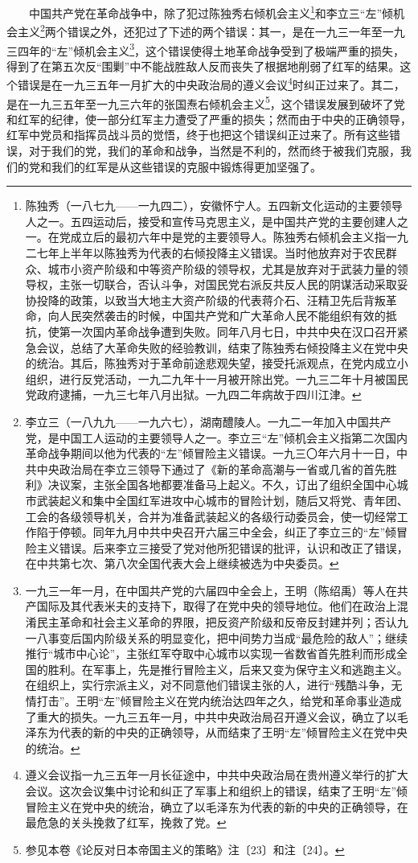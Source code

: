 \documentclass[cn,11pt,chinese]{elegantbook}
\begin{document}
　　中国共产党在革命战争中，除了犯过陈独秀右倾机会主义\footnote[4]{ 陈独秀（一八七九——一九四二），安徽怀宁人。五四新文化运动的主要领导人之一。五四运动后，接受和宣传马克思主义，是中国共产党的主要创建人之一。在党成立后的最初六年中是党的主要领导人。陈独秀右倾机会主义指一九二七年上半年以陈独秀为代表的右倾投降主义错误。当时他放弃对于农民群众、城市小资产阶级和中等资产阶级的领导权，尤其是放弃对于武装力量的领导权，主张一切联合，否认斗争，对国民党右派反共反人民的阴谋活动采取妥协投降的政策，以致当大地主大资产阶级的代表蒋介石、汪精卫先后背叛革命，向人民突然袭击的时候，中国共产党和广大革命人民不能组织有效的抵抗，使第一次国内革命战争遭到失败。同年八月七日，中共中央在汉口召开紧急会议，总结了大革命失败的经验教训，结束了陈独秀右倾投降主义在党中央的统治。其后，陈独秀对于革命前途悲观失望，接受托派观点，在党内成立小组织，进行反党活动，一九二九年十一月被开除出党。一九三二年十月被国民党政府逮捕，一九三七年八月出狱。一九四二年病故于四川江津。}和李立三“左”倾机会主义\footnote[5]{ 李立三（一八九九——一九六七），湖南醴陵人。一九二一年加入中国共产党，是中国工人运动的主要领导人之一。李立三“左”倾机会主义指第二次国内革命战争期间以他为代表的“左”倾冒险主义错误。一九三〇年六月十一日，中共中央政治局在李立三领导下通过了《新的革命高潮与一省或几省的首先胜利》决议案，主张全国各地都要准备马上起义。不久，订出了组织全国中心城市武装起义和集中全国红军进攻中心城市的冒险计划，随后又将党、青年团、工会的各级领导机关，合并为准备武装起义的各级行动委员会，使一切经常工作陷于停顿。同年九月中共中央召开六届三中全会，纠正了李立三的“左”倾冒险主义错误。后来李立三接受了党对他所犯错误的批评，认识和改正了错误，在中共第七次、第八次全国代表大会上继续被选为中央委员。}两个错误之外，还犯过了下述的两个错误：其一，是在一九三一年至一九三四年的“左”倾机会主义\footnote[6]{ 一九三一年一月，在中国共产党的六届四中全会上，王明（陈绍禹）等人在共产国际及其代表米夫的支持下，取得了在党中央的领导地位。他们在政治上混淆民主革命和社会主义革命的界限，把反资产阶级和反帝反封建并列；否认九一八事变后国内阶级关系的明显变化，把中间势力当成“最危险的敌人”；继续推行“城市中心论”，主张红军夺取中心城市以实现一省数省首先胜利而形成全国的胜利。在军事上，先是推行冒险主义，后来又变为保守主义和逃跑主义。在组织上，实行宗派主义，对不同意他们错误主张的人，进行“残酷斗争，无情打击”。王明“左”倾冒险主义在党内统治达四年之久，给党和革命事业造成了重大的损失。一九三五年一月，中共中央政治局召开遵义会议，确立了以毛泽东为代表的新的中央的正确领导，从而结束了王明“左”倾冒险主义在党中央的统治。}，这个错误使得土地革命战争受到了极端严重的损失，得到了在第五次反“围剿”中不能战胜敌人反而丧失了根据地削弱了红军的结果。这个错误是在一九三五年一月扩大的中央政治局的遵义会议\footnote[7]{ 遵义会议指一九三五年一月长征途中，中共中央政治局在贵州遵义举行的扩大会议。这次会议集中讨论和纠正了军事上和组织上的错误，结束了王明“左”倾冒险主义在党中央的统治，确立了以毛泽东为代表的新的中央的正确领导，在最危急的关头挽救了红军，挽救了党。}时纠正过来了。其二，是在一九三五年至一九三六年的张国焘右倾机会主义\footnote[8]{ 参见本卷《论反对日本帝国主义的策略》注〔23〕和注〔24〕。}，这个错误发展到破坏了党和红军的纪律，使一部分红军主力遭受了严重的损失；然而由于中央的正确领导，红军中党员和指挥员战斗员的觉悟，终于也把这个错误纠正过来了。所有这些错误，对于我们的党，我们的革命和战争，当然是不利的，然而终于被我们克服，我们的党和我们的红军是从这些错误的克服中锻炼得更加坚强了。\\
\end{document}
